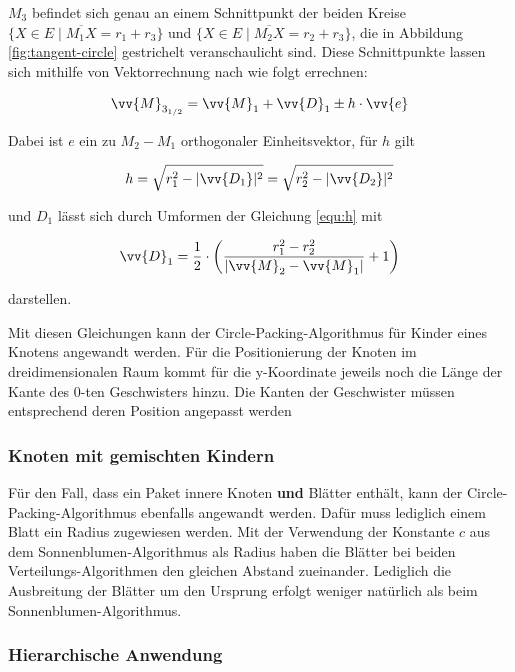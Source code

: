 $M_3$ befindet sich genau an einem Schnittpunkt der beiden Kreise $\lbrace X \in E \mid \overline{M_1 X} = r_1 + r_3 \rbrace$ und $\lbrace X \in E \mid \overline{M_2 X} = r_2 + r_3 \rbrace$, die in Abbildung \ref{fig:tangent-circle} gestrichelt veranschaulicht sind. Diese Schnittpunkte lassen sich mithilfe von Vektorrechnung nach \cite{wikipedia2017schnitt} wie folgt errechnen:

\begin{equation}
  \vv{M}_{3_{1/2}} = \vv{M}_1 + \vv{D}_{1} \pm h \cdot \vv{e}
\end{equation}

Dabei ist $e$ ein zu $M_2 - M_1$ orthogonaler Einheitsvektor, für $h$ gilt

\begin{equation}
\label{equ:h}
  h = \sqrt{r_1^2 - \vert \vv{D_1} \vert^2} = \sqrt{r_2^2 - \vert \vv{D_2} \vert^2}
\end{equation}

und $D_1$ lässt sich durch Umformen der Gleichung \ref{equ:h} mit

\begin{equation}
  \vv{D}_1 = \frac{1}{2} \cdot \left( \frac{r_1^2 - r_2^2}{\vert \vv{M}_2 - \vv{M}_1 \vert} + 1 \right)
\end{equation}

darstellen.

Mit diesen Gleichungen kann der Circle-Packing-Algorithmus für Kinder eines Knotens angewandt werden. Für die Positionierung der Knoten im dreidimensionalen Raum kommt für die y-Koordinate jeweils noch die Länge der Kante des $0$-ten Geschwisters hinzu. Die Kanten der Geschwister müssen entsprechend deren Position angepasst werden

\subsubsection*{Knoten mit gemischten Kindern}

Für den Fall, dass ein Paket innere Knoten \textbf{und} Blätter enthält, kann der Circle-Packing-Algorithmus ebenfalls angewandt werden. Dafür muss lediglich einem Blatt ein Radius zugewiesen werden. Mit der Verwendung der Konstante $c$ aus dem Sonnenblumen-Algorithmus als Radius haben die Blätter bei beiden Verteilungs-Algorithmen den gleichen Abstand zueinander. Lediglich die Ausbreitung der Blätter um den Ursprung erfolgt weniger natürlich als beim Sonnenblumen-Algorithmus.

\subsubsection*{Hierarchische Anwendung}

